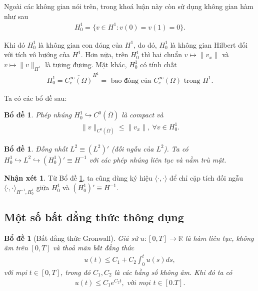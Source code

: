 \documentclass[12pt,a4paper]{article}
\newtheorem{lemma}[theorem]{Bổ đề}[section]
\theoremstyle{definition}
\newtheorem{remark}[definition]{Nhận xét}[section]
\theoremstyle{definition}
\begin{document}
Ngoài các không gian nói trên, trong khoá luận này còn sử dụng không gian hàm như sau
\begin{align}
    H^1_0 = \{ v \in H^1 : v(0) = v(1) = 0 \}. \label{ch2:funcspace:H10}
\end{align}

Khi đó $H^1_0$ là không gian con đóng của $H^1$, do đó, $H^1_0$ là không gian Hilbert đối với tích vô hướng của $H^1$. Hơn nữa, trên $H^1_0$ thì hai chuẩn $v \longmapsto \|v_x\|$ và $v \longmapsto \|v\|_{H^1}$ là tương đương. Mặt khác, $H^1_0$ có tính chất
\begin{align}
    H^1_0 = \overline{C^\infty_c(\Omega)}^{H^1} = \text{ bao đóng của } C^\infty_c(\Omega) \text{ trong } H^1. \label{ch2:funcspace:H10:closure}
\end{align}

Ta có các bổ đề sau:

\begin{lemma}
Phép nhúng $H^1_0 \hookrightarrow C^0(\overline{\Omega})$ là compact và
\begin{align}
    \|v\|_{C^0(\overline{\Omega})} \le \|v_x\|,\ \forall v \in H^1_0.
\end{align}
\end{lemma}

\begin{lemma} \label{ch2:funcspace:embededlemma}
Đồng nhất $L^2 \equiv (L^2)'$ (đối ngẫu của $L^2$). Ta có $H^1_0 \hookrightarrow L^2 \hookrightarrow (H^1_0)' \equiv H^{-1}$ với các phép nhúng liên tục và nằm trù mật.
\end{lemma}

\begin{remark}
Từ Bổ đề \ref{ch2:funcspace:embededlemma}, ta cũng dùng ký hiệu $\langle \cdot,\cdot \rangle$ để chỉ cặp tích đối ngẫu $\langle \cdot,\cdot \rangle_{H^{-1}, H^1_0}$ giữa $H^1_0$ và $(H^1_0)' \equiv H^{-1}$.
\end{remark}


\subsection{Một số bất đẳng thức thông dụng}

\begin{lemma}[Bất đẳng thức Gronwall]
Giả sử $u: [0,T] \to \mathbb{R}$ là hàm liên tục, không âm trên $[0,T]$ và thoả mãn bất đẳng thức
\begin{align*}
    u(t) \le C_1 + C_2\int_0^t u(s)ds,
\end{align*}
với mọi $t \in [0,T]$, trong đó $C_1, C_2$ là các hằng số không âm. Khi đó ta có
\begin{align*}
    u(t) \le C_1 e^{C_2t}, \textit{ với mọi } t \in [0.T].
\end{align*}
\end{lemma}
\end{document}
